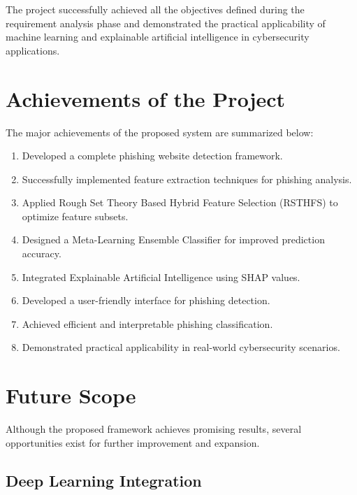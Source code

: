 \documentclass[12pt]{report}
\begin{document}
The project successfully achieved all the objectives defined during the requirement analysis phase and demonstrated the practical applicability of machine learning and explainable artificial intelligence in cybersecurity applications.

\section{Achievements of the Project}

The major achievements of the proposed system are summarized below:

\begin{enumerate}
    \item Developed a complete phishing website detection framework.
    
    \item Successfully implemented feature extraction techniques for phishing analysis.
    
    \item Applied Rough Set Theory Based Hybrid Feature Selection (RSTHFS) to optimize feature subsets.
    
    \item Designed a Meta-Learning Ensemble Classifier for improved prediction accuracy.
    
    \item Integrated Explainable Artificial Intelligence using SHAP values.
    
    \item Developed a user-friendly interface for phishing detection.
    
    \item Achieved efficient and interpretable phishing classification.
    
    \item Demonstrated practical applicability in real-world cybersecurity scenarios.
\end{enumerate}

\section{Future Scope}

Although the proposed framework achieves promising results, several opportunities exist for further improvement and expansion.

\subsection{Deep Learning Integration}
\end{document}
